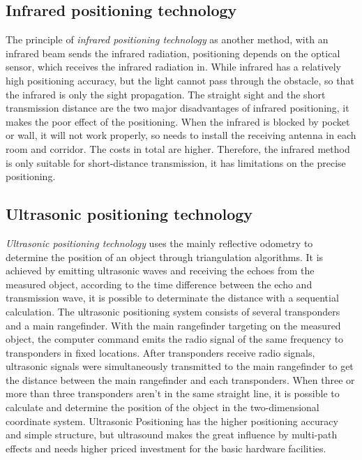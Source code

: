 \subsection{Infrared positioning technology}

The principle of \textit{infrared positioning technology} as another method, with an infrared beam sends the infrared radiation, positioning depends on the optical sensor, which receives the infrared radiation in\cite{DrRainerMautz2012}. While infrared has a relatively high positioning accuracy, but the light cannot pass through the obstacle, so that the infrared is only the sight propagation. The straight sight and the short transmission distance are the two major disadvantages of infrared positioning, it makes the poor effect of the positioning. When the infrared is blocked by pocket or wall, it will not work properly, so needs to install the receiving antenna in each room and corridor. The costs in total are higher. Therefore, the infrared method is only suitable for short-distance transmission, it has limitations on the precise positioning.  

\subsection{Ultrasonic positioning technology}

\textit{Ultrasonic positioning technology} uses the mainly reflective odometry to determine the position of an object through triangulation algorithms. It is achieved by emitting ultrasonic waves and receiving the echoes from the measured object, according to the time difference between the echo and transmission wave, it is possible to determinate the distance with a sequential calculation\cite{DrRainerMautz2012}. The ultrasonic positioning system consists of several transponders and a main rangefinder. With the main rangefinder targeting on the measured object, the computer command emits the radio signal of the same frequency to transponders in fixed locations. After transponders receive radio signals, ultrasonic signals were simultaneously transmitted to the main rangefinder to get the distance between the main rangefinder and each transponders. When three or more than three transponders aren’t in the same straight line, it is possible to calculate and determine the position of the object in the two-dimensional coordinate system. Ultrasonic Positioning has the higher positioning accuracy and simple structure, but ultrasound makes the great influence by multi-path effects and needs higher priced investment for the basic hardware facilities.    

